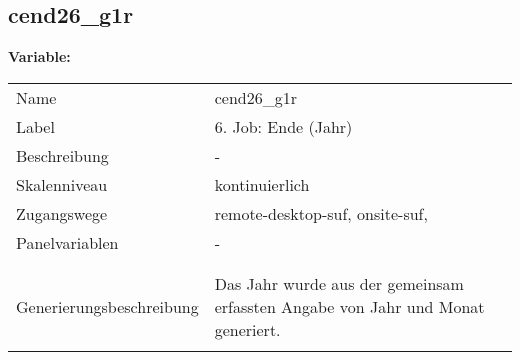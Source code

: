 	
	
	\subsection{cend26\_g1r}
	\label{subSection:cend26_g1r}

	\noindent\textbf{Variable:}\\
		\begin{tabular}{lL{11.3cm}}
			\label{tableVariable:cend26_g1r}
			Name & cend26\_g1r \\
			Label & 6. Job: Ende (Jahr) \\
			Beschreibung & - \\
			Skalenniveau & kontinuierlich \\
			Zugangswege &
				remote-desktop-suf,
				onsite-suf,
 \\
			Panelvariablen & -
			 \\
			 \\
 \\
					Generierungsbeschreibung & Das Jahr wurde aus der gemeinsam erfassten Angabe von Jahr und Monat generiert. 
				 \\	
			 \\
		\end{tabular}





